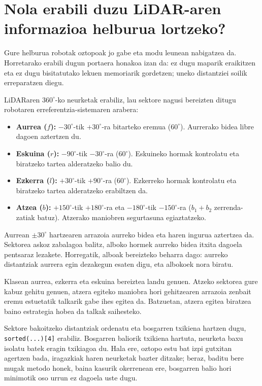\section[Nola erabili duzu LiDAR-aren informazioa helburua lortzeko?][LiDAR informazioaren erabilera]{Nola erabili duzu LiDAR-aren informazioa helburua lortzeko?}\label{sec:oz-sektoreak}

Gure helburua robotak oztopoak jo gabe eta modu leunean nabigatzea da. Horretarako erabili dugun portaera honakoa izan da: ez dugu maparik eraikitzen eta ez dugu bisitatutako lekuen memoriarik gordetzen; uneko distantziei soilik erreparatzen diegu.

LiDARaren $360^\circ$-ko neurketak erabiliz, lau sektore nagusi bereizten ditugu robotaren erreferentzia-sistemaren arabera:
\begin{itemize}[noitemsep,topsep=2pt]
  \item \textbf{Aurrea ($f$):} $-30^\circ$-tik $+30^\circ$-ra bitarteko eremua ($60^\circ$). Aurrerako bidea libre dagoen aztertzen du.
  \item \textbf{Eskuina ($r$):} $-90^\circ$-tik $-30^\circ$-ra ($60^\circ$). Eskuineko hormak kontrolatu eta biratzeko tartea alderatzeko balio du.
  \item \textbf{Ezkerra ($l$):} $+30^\circ$-tik $+90^\circ$-ra ($60^\circ$). Ezkerreko hormak kontrolatu eta biratzeko tartea alderatzeko erabiltzen da.
  \item \textbf{Atzea ($b$):} $+150^\circ$-tik $+180^\circ$-ra eta $-180^\circ$-tik $-150^\circ$-ra ($b_1 + b_2$ zerrenda-zatiak batuz). Atzerako maniobren segurtasuna egiaztatzeko.
\end{itemize}

Aurrean $\pm 30^\circ$ hartzearen arrazoia aurreko bidea eta haren ingurua aztertzea da. Sektorea askoz zabalagoa balitz, alboko hormek aurreko bidea itxita dagoela pentsaraz lezakete. Horregatik, alboak bereizteko beharra dago: aurreko distantziak aurrera egin dezakegun esaten digu, eta albokoek nora biratu.

Klasean aurrea, ezkerra eta eskuina bereiztea landu genuen. Atzeko sektorea gure kabuz gehitu genuen, atzera egiteko maniobra hori gehitzearen arrazoia zenbait eremu estuetatik talkarik gabe ihes egitea da. Batzuetan, atzera egitea biratzea baino estrategia hobea da talkak saihesteko.

Sektore bakoitzeko distantziak ordenatu eta bosgarren txikiena hartzen dugu, \texttt{sorted(...)[4]} erabiliz. Bosgarren baliorik txikiena hartuta, neurketa baxu isolatu batek eragin txikiagoa du. Hala ere, oztopo estu bat izpi gutxitan agertzen bada, iragazkiak haren neurketak bazter ditzake; beraz, baditu bere mugak metodo honek, baina kasurik okerrenean ere, bosgarren balio hori minimotik oso urrun ez dagoela uste dugu.


